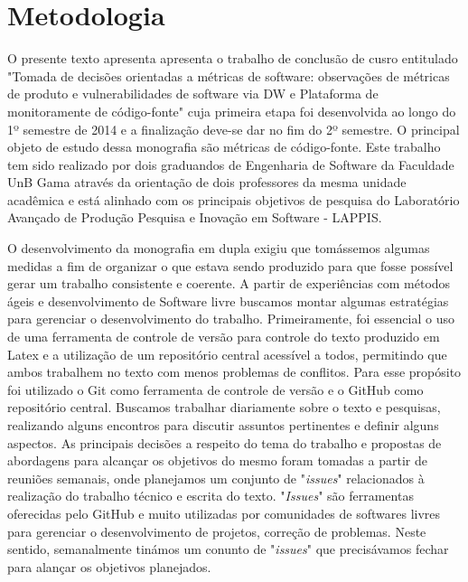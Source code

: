 \section{Metodologia}
\label{sec:methodology}

O presente texto apresenta apresenta o trabalho de conclusão de cusro entitulado "Tomada de decisões orientadas a métricas de software: observações de métricas de produto e vulnerabilidades de software via DW e Plataforma de monitoramente de código-fonte" cuja primeira etapa foi desenvolvida ao longo do 1º semestre de 2014 e a finalização deve-se dar no fim do 2º semestre. O principal objeto de estudo dessa monografia são métricas de código-fonte. Este trabalho tem sido realizado por dois graduandos de Engenharia de Software da Faculdade UnB Gama através da orientação de dois professores da mesma unidade acadêmica e está alinhado com os principais objetivos de pesquisa do Laboratório Avançado de Produção Pesquisa e Inovação em Software - LAPPIS. 

O desenvolvimento da monografia em dupla exigiu que tomássemos algumas medidas a fim de organizar o que estava sendo produzido para que fosse possível gerar um trabalho consistente e coerente. A partir de experiências com métodos ágeis e desenvolvimento de Software livre buscamos montar algumas estratégias para gerenciar o desenvolvimento do trabalho. Primeiramente, foi essencial o uso de uma ferramenta de controle de versão para controle do texto produzido em Latex e a utilização de um repositório central acessível a todos, permitindo que ambos trabalhem no texto com menos problemas de conflitos. Para esse propósito foi utilizado o Git como ferramenta de controle de versão e o GitHub como repositório central. Buscamos trabalhar diariamente sobre o texto e pesquisas, realizando alguns encontros para discutir assuntos pertinentes e definir alguns aspectos. As principais decisões a respeito do tema do trabalho e propostas de abordagens para alcançar os objetivos do mesmo foram tomadas a partir de reuniões semanais, onde planejamos um conjunto de "\emph{issues}" relacionados à realização do trabalho técnico e escrita do texto. "\emph{Issues}" são ferramentas oferecidas pelo GitHub e muito utilizadas por comunidades de softwares livres para gerenciar o desenvolvimento de projetos, correção de problemas. Neste sentido, semanalmente tinámos um conunto de "\emph{issues}" que precisávamos fechar para alançar os objetivos planejados.

   
